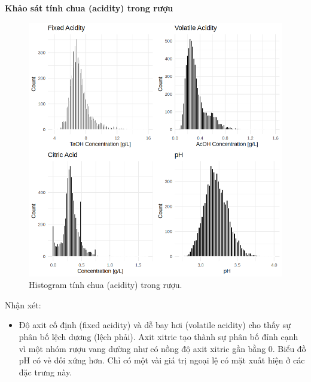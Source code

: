 \textbf{Khảo sát tính chua (acidity) trong rượu}
\begin{figure}[H]
    \centering
    \includegraphics[width=0.75\columnwidth]{wine_colors/wine_acidity.png}
    \caption{Histogram tính chua (acidity) trong rượu.}
    \label{fig:wine_acidity}
\end{figure}
Nhận xét:
\begin{itemize}
    \item Độ axit cố định (fixed acidity) và dễ bay hơi (volatile acidity) cho thấy sự phân bố lệch dương (lệch phải). Axit xitric tạo thành sự phân bố đỉnh cạnh vì một nhóm rượu vang dường như có nồng độ axit xitric gần bằng 0. Biểu đồ pH có vẻ đối xứng hơn. Chỉ có một vài giá trị ngoại lệ có mặt xuất hiện ở các đặc trưng này.
\end{itemize}

